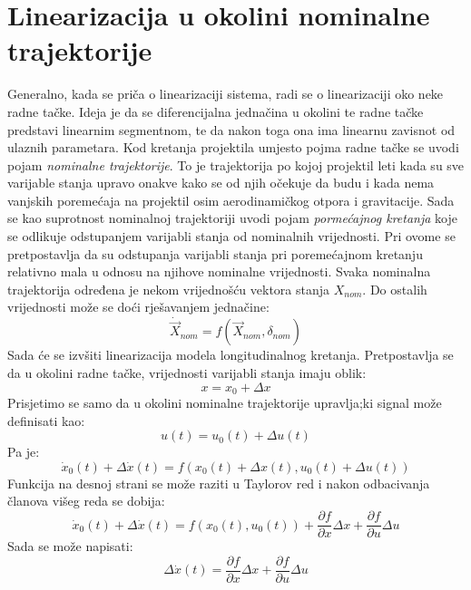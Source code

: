 \section{Linearizacija u okolini nominalne trajektorije}
Generalno, kada se priča o linearizaciji sistema, radi se o linearizaciji oko neke radne tačke. Ideja je 
da se diferencijalna jednačina u okolini te radne tačke predstavi linearnim segmentnom, te da 
nakon toga ona ima linearnu zavisnot od ulaznih parametara. Kod kretanja projektila umjesto pojma 
radne tačke se uvodi pojam \textit{nominalne trajektorije}. To je trajektorija po kojoj projektil 
leti kada su sve varijable stanja upravo onakve kako se od njih očekuje da budu i kada nema vanjskih poremećaja 
na projektil osim aerodinamičkog otpora i gravitacije. Sada se kao suprotnost nominalnoj trajektoriji 
uvodi pojam \textit{pormećajnog kretanja} koje se odlikuje odstupanjem varijabli stanja od nominalnih vrijednosti. 
Pri ovome se pretpostavlja da su odstupanja varijabli stanja pri poremećajnom kretanju relativno mala u odnosu na 
njihove nominalne vrijednosti. Svaka nominalna trajektorija određena je nekom vrijednošću vektora stanja $X_{nom}$.
Do ostalih vrijednosti može se doći rješavanjem jednačine:
\begin{equation}
    \dot{\vec{X}}_{nom} = f(\vec{X}_{nom}, \delta_{nom})
\end{equation}
Sada će se izvšiti linearizacija modela longitudinalnog kretanja. Pretpostavlja se da u okolini radne tačke, 
vrijednosti varijabli stanja imaju oblik:
\begin{equation}
    x=x_0+\Delta x 
\end{equation}
Prisjetimo se samo da u okolini nominalne trajektorije upravlja;ki signal može definisati kao:
\begin{equation}
    u(t) = u_0(t)+\Delta u(t)
\end{equation}
Pa je:
\begin{equation}
    \dot{x}_0(t)+\Delta \dot{x}(t)=f(x_0(t)+\Delta x(t),u_0(t)+\Delta u(t))
\end{equation}
Funkcija na desnoj strani se može raziti u Taylorov red i nakon odbacivanja članova višeg reda
se dobija:
\begin{equation}
    \dot{x}_0(t)+\Delta \dot{x}(t)=f(x_0(t),u_0(t))+\frac{\partial f}{\partial x}\Delta x+\frac{\partial f}{\partial u}\Delta u
\end{equation}
Sada se može napisati:
\begin{equation}
    \Delta \dot{x}(t)=\frac{\partial f}{\partial x}\Delta x+\frac{\partial f}{\partial u}\Delta u
\end{equation}
